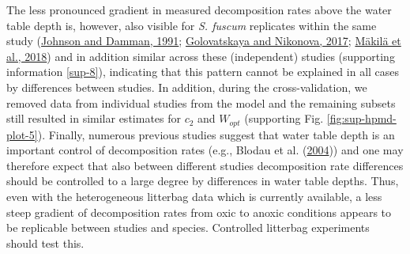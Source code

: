 \documentclass[
  12pt,
]{article}
\begin{document}
The less pronounced gradient in measured decomposition rates above the water table depth is, however, also visible for \emph{S. fuscum} replicates within the same study (\protect\hyperlink{ref-Johnson.1991}{Johnson and Damman, 1991}; \protect\hyperlink{ref-Golovatskaya.2017}{Golovatskaya and Nikonova, 2017}; \protect\hyperlink{ref-Makila.2018}{Mäkilä et al., 2018}) and in addition similar across these (independent) studies (supporting information \ref{sup-8}), indicating that this pattern cannot be explained in all cases by differences between studies. In addition, during the cross-validation, we removed data from individual studies from the model and the remaining subsets still resulted in similar estimates for \(c_2\) and \(W_{opt}\) (supporting Fig. \ref{fig:sup-hpmd-plot-5}). Finally, numerous previous studies suggest that water table depth is an important control of decomposition rates (e.g., Blodau et al. (\protect\hyperlink{ref-Blodau.2004}{2004})) and one may therefore expect that also between different studies decomposition rate differences should be controlled to a large degree by differences in water table depths. Thus, even with the heterogeneous litterbag data which is currently available, a less steep gradient of decomposition rates from oxic to anoxic conditions appears to be replicable between studies and species. Controlled litterbag experiments should test this.
\end{document}
